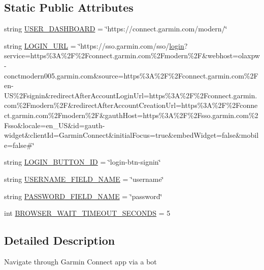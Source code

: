 \subsection*{Static Public Attributes}
\begin{DoxyCompactItemize}
\item 
string \hyperlink{classpygce_1_1models_1_1bot_1_1_garmin_connect_bot_a4223a72025e44839acd9ebbdfca095da}{U\+S\+E\+R\+\_\+\+D\+A\+S\+H\+B\+O\+A\+RD} = \char`\"{}https\+://connect.\+garmin.\+com/modern/\char`\"{}
\item 
string \hyperlink{classpygce_1_1models_1_1bot_1_1_garmin_connect_bot_a43f013f65c970ca2dc82e066d8de4d2b}{L\+O\+G\+I\+N\+\_\+\+U\+RL} = \char`\"{}https\+://sso.\+garmin.\+com/sso/\hyperlink{classpygce_1_1models_1_1bot_1_1_garmin_connect_bot_a31c8153cff1e4c2ce2a66d3b3aada3f1}{login}?service=https\%3\+A\%2\+F\%2\+Fconnect.\+garmin.\+com\%2\+Fmodern\%2\+F\&webhost=olaxpw-\/conctmodern005.\+garmin.\+com\&source=https\%3\+A\%2\+F\%2\+Fconnect.\+garmin.\+com\%2\+Fen-\/\+U\+S\%2\+Fsignin\&redirect\+After\+Account\+Login\+Url=https\%3\+A\%2\+F\%2\+Fconnect.\+garmin.\+com\%2\+Fmodern\%2\+F\&redirect\+After\+Account\+Creation\+Url=https\%3\+A\%2\+F\%2\+Fconnect.\+garmin.\+com\%2\+Fmodern\%2\+F\&gauth\+Host=https\%3\+A\%2\+F\%2\+Fsso.\+garmin.\+com\%2\+Fsso\&locale=en\+\_\+\+U\+S\&id=gauth-\/widget\&client\+Id=\+Garmin\+Connect\&initial\+Focus=true\&embed\+Widget=false\&mobile=false\#\char`\"{}
\item 
string \hyperlink{classpygce_1_1models_1_1bot_1_1_garmin_connect_bot_a792c3468032c4154b334cacfb30a871f}{L\+O\+G\+I\+N\+\_\+\+B\+U\+T\+T\+O\+N\+\_\+\+ID} = \char`\"{}login-\/btn-\/signin\char`\"{}
\item 
string \hyperlink{classpygce_1_1models_1_1bot_1_1_garmin_connect_bot_a0128de4e9df3cd9171f697709b634865}{U\+S\+E\+R\+N\+A\+M\+E\+\_\+\+F\+I\+E\+L\+D\+\_\+\+N\+A\+ME} = \char`\"{}username\char`\"{}
\item 
string \hyperlink{classpygce_1_1models_1_1bot_1_1_garmin_connect_bot_aa5839cf18d60997c81245cebea3eb307}{P\+A\+S\+S\+W\+O\+R\+D\+\_\+\+F\+I\+E\+L\+D\+\_\+\+N\+A\+ME} = \char`\"{}password\char`\"{}
\item 
int \hyperlink{classpygce_1_1models_1_1bot_1_1_garmin_connect_bot_a71d72a5424537d2a39e05e75f654697e}{B\+R\+O\+W\+S\+E\+R\+\_\+\+W\+A\+I\+T\+\_\+\+T\+I\+M\+E\+O\+U\+T\+\_\+\+S\+E\+C\+O\+N\+DS} = 5
\end{DoxyCompactItemize}


\subsection{Detailed Description}
\begin{DoxyVerb}Navigate through Garmin Connect app via a bot \end{DoxyVerb}
 

